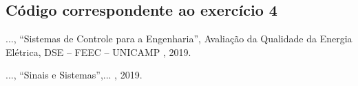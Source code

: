 \documentclass[a4paper,12pt,oneside,openany,table,xcdraw]{article}
\begin{document}
\vspace{0.3cm}
\subsection{Código correspondente ao exercício 4} \label{anexo:ex4}


\newpage
\begin{thebibliography}{9} 
    ...,
    “Sistemas de Controle para a Engenharia”, Avaliação da Qualidade da Energia Elétrica, DSE – FEEC – UNICAMP , 2019.
 
    ...,
    “Sinais e Sistemas”,... , 2019.

\end{thebibliography}
\end{document}
